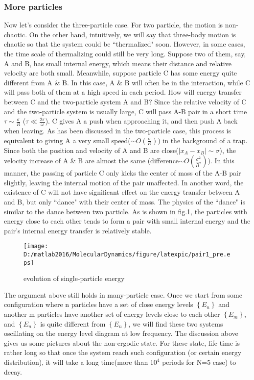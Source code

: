 \documentclass[aps,pre,twocolumn,groupedaddress]{revtex4-1}
\begin{document}
\subsubsection{More particles}
Now let's consider the three-particle case. For two particle, the motion is non-chaotic. On the other hand, intuitively, we will say that three-body motion is chaotic so that the system could be ``thermalized" soon. However, in some cases, the time scale of thermalizing could still be very long. Suppose two of them, say, A and B, has small internal energy, which means their distance and relative velocity are both small. Meanwhile, suppose particle C has some energy quite different from A \& B. In this case, A \& B will often be in the interaction, while C will pass both of them at a high speed in each period. How will energy transfer between C and the two-particle system A and B? Since the relative velocity of C and the two-particle system is usually large, C will pass A-B pair in a short time $\tau\sim\frac{\sigma}{R}$ ($\tau\ll\frac{2\pi}{\omega}$). C gives A a push when approaching it, and then push A back when leaving.  As has been discussed in the two-particle case, this process is equivalent to giving A a very small speed($\sim O(\frac{\sigma}{R})$) in the background of a trap. Since both the position and velocity of A and B are close($|x_A-x_B|\sim\sigma$), the velocity increase of A \& B are almost the same (difference$\sim O(\frac{\sigma^2}{R^2})$). In this manner, the passing of particle C only kicks the center of mass of the A-B pair slightly, leaving the internal motion of the pair unaffected. In another word, the existence of C will not have significant effect on the energy transfer between A and B, but only ``dance" with their center of mass. The physics of the ``dance" is similar to the dance between two particle. As is shown in fig.\ref{fig:thermalization4}, the particles with energy close to each other tends to form a pair with small internal energy and the pair's internal energy transfer is relatively stable.

\begin{figure}
\centering
\texttt{[image: D:/matlab2016/MolecularDynamics/figure/latexpic/pair1\_pre.eps]}
\caption{evolution of single-particle energy}
\label{fig:thermalization4}
\end{figure}

The argument above still holds in many-particle case. Once we start from some configuration where n particles have a set of close energy levels $\left\lbrace E_n\right\rbrace $ and another m particles have another set of energy levels close to each other $\left\lbrace E_m\right\rbrace $, and $\left\lbrace E_n\right\rbrace $ is quite different from $\left\lbrace E_n\right\rbrace $, we will find these two systems oscillating on the energy level diagram at low frequency. 
The discussion above gives us some pictures about the non-ergodic state. For these state, life time is rather long so that once the system reach such configuration (or certain energy distribution), it will take a long time(more than $10^4$ periods for N=5 case) to decay. 
\end{document}
